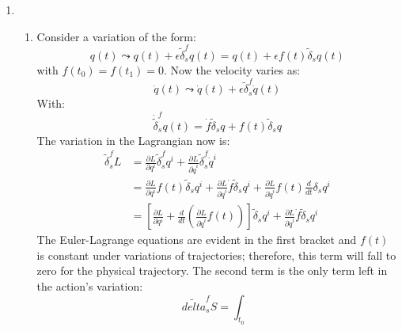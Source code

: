 \documentclass[12pt,a4]{article}
\begin{document}
\begin{enumerate}
\begin{enumerate}
    \end{enumerate}
  \item
    \begin{enumerate}
      \item
        Consider a variation of the form:
        \begin{equation*}
          q(t) \leadsto q(t) + \epsilon \tilde{\delta}^f_s q(t) = q(t) + \epsilon f(t) \tilde{\delta}_s q(t)
        \end{equation*}
        with $f(t_0) = f(t_1) = 0$.
        Now the velocity varies as:
        \begin{equation*}
          \dot q(t) \leadsto \dot q(t) + \epsilon \tilde{\delta}^f_s \dot q(t) 
        \end{equation*}
        With:
        \begin{equation*}
          \dot\tilde{\delta}^f_s q(t) = \dot f \tilde{\delta}_s q + f(t) \tilde{\delta}_s q
        \end{equation*}
        The variation in the Lagrangian now is:
        \begin{align*}
          \tilde{\delta}_s^f L &= \frac{\partial L}{\partial q^i} \tilde{\delta}_s^fq^i + \frac{\partial L}{\partial \dot q^i} \tilde{\delta}_s^f\dot q^i\\
                               &= \frac{\partial L}{\partial q^i} f(t)\tilde{\delta}_sq^i + \frac{\partial L}{\partial \dot q^i} \dot f \tilde{\delta}_s q^i + \frac{\partial L}{\partial \dot q^i} f(t) \frac{d}{dt}{\delta}_s q^i\\
                               &= \left[\frac{\partial L}{\partial q^i} + \frac{d}{dt}\left(\frac{\partial L}{\partial \dot q^i} f(t)\right)\right] \tilde{\delta}_s q^i + \frac{\partial L}{\partial \dot q^i} \dot f \tilde{\delta}_s q^i
        \end{align*}
        The Euler-Lagrange equations are evident in the first bracket and $f(t)$ is constant under variations of trajectories; therefore, this term will fall to zero for the physical trajectory.
        The second term is the only term left in the action's variation:
        \begin{equation*}
          \tilde{delta}_s^f S = \int_{t_0}
        \end{equation*}
    \end{enumerate}
\end{enumerate}
\end{document}
